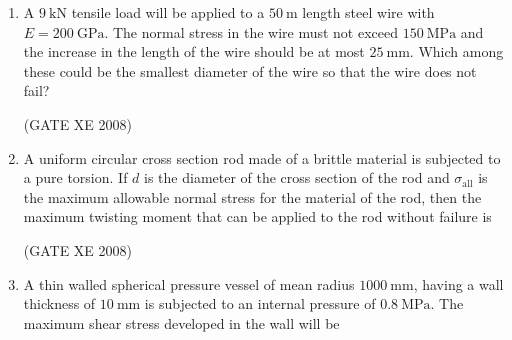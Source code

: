 \documentclass[12pt]{article}
\begin{document}
\begin{enumerate}
(GATE XE 2008)  

\item A $9 \ \text{kN}$ tensile load will be applied to a $50 \ \text{m}$ length steel wire with $E = 200 \ \text{GPa}$. The normal stress in the wire must not exceed $150 \ \text{MPa}$ and the increase in the length of the wire should be at most $25 \ \text{mm}$. Which among these could be the smallest diameter of the wire so that the wire does not fail?  

\begin{enumerate}
\end{enumerate}

(GATE XE 2008)  

\item A uniform circular cross section rod made of a brittle material is subjected to a pure torsion. If $d$ is the diameter of the cross section of the rod and $\sigma_{\text{all}}$ is the maximum allowable normal stress for the material of the rod, then the maximum twisting moment that can be applied to the rod without failure is  

\begin{enumerate}
\end{enumerate}

(GATE XE 2008)  

\item A thin walled spherical pressure vessel of mean radius $1000 \ \text{mm}$, having a wall thickness of $10 \ \text{mm}$ is subjected to an internal pressure of $0.8 \ \text{MPa}$. The maximum shear stress developed in the wall will be  

\begin{enumerate}
\end{enumerate}


\end{enumerate}
\end{document}
